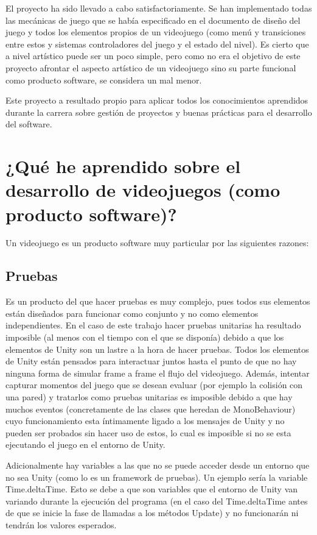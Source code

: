 
El proyecto ha sido llevado a cabo satisfactoriamente. Se han implementado todas las mecánicas de juego que se había especificado en el documento de diseño del juego y todos los elementos propios de un videojuego (como menú y transiciones entre estos y sistemas controladores del juego y el estado del nivel). Es cierto que a nivel artístico puede ser un poco simple, pero como no era el objetivo de este proyecto afrontar el aspecto artístico de un videojuego sino su parte funcional como producto software, se considera un mal menor.

Este proyecto a resultado propio para aplicar todos los conocimientos aprendidos durante la carrera sobre gestión de proyectos y buenas prácticas para el desarrollo del software. 

\section{¿Qué he aprendido sobre el desarrollo de videojuegos (como producto software)?}
Un videojuego es un producto software muy particular por las siguientes razones:

\subsection{Pruebas}
Es un producto del que hacer pruebas es muy complejo, pues todos sus elementos están diseñados para funcionar como conjunto y no como elementos independientes. En el caso de este trabajo hacer pruebas unitarias ha resultado imposible (al menos con el tiempo con el que se disponía) debido a que los elementos de Unity son un lastre a la hora de hacer pruebas. Todos los elementos de Unity están pensados para interactuar juntos hasta el punto de que no hay ninguna forma de simular frame a frame el flujo del videojuego. Además, intentar capturar momentos del juego que se desean evaluar (por ejemplo la colisión con una pared) y tratarlos como pruebas unitarias es imposible debido a que hay muchos eventos (concretamente de las clases que heredan de MonoBehaviour) cuyo funcionamiento esta íntimamente ligado a los mensajes de Unity y no pueden ser probados sin hacer uso de estos, lo cual es imposible si no se esta ejecutando el juego en el entorno de Unity.

Adicionalmente hay variables a las que no se puede acceder desde un entorno que no sea Unity (como lo es un framework de pruebas). Un ejemplo sería la variable Time.deltaTime. Esto se debe a que son variables que el entorno de Unity van variando durante la ejecución del programa (en el caso del Time.deltaTime antes de que se inicie la fase de llamadas a los métodos Update) y no funcionarán ni tendrán los valores esperados.

